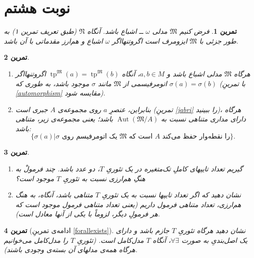\documentclass[12pt,a4paper]{report}
\theoremstyle{colorhead}
\newtheorem{tam}{تمرین}
\DeclareMathOperator{\tp}{tp}
\DeclareMathOperator{\Aut}{Aut}
\begin{document}
\section{نوبت هشتم}
\begin{tam}
فرض کنیم
$\mathfrak{M}$
مدلی
$\omega$ ــ
اشباع باشد. آنگاه
$\mathfrak{N}$
(طبق تعریف تمرین ۱) به طور جزئی با
$\mathfrak{M}$
ایزومرف است اگروتنهااگر
$\omega$
اشباع و هم‌ارز مقدماتی با آن باشد.
\end{tam}
\begin{tam}
\hfill
\begin{enumerate}
\item 
هرگاه
$\mathfrak{M}$
مدلی اشباع باشد و 
$a,b\in M$،
آنگاه
$\tp^\mathfrak{M}(a)=\tp^\mathfrak{M}(b)$
اگروتنهااگر
اتومرفیسمی از
$\mathfrak{M}$
مانند
$\sigma$
موجود باشد، به طوری که
$\sigma(a)=\sigma(b)$
(با تمرینِ
\ref{automorphism}
مقایسه شود).
\item 
بنابراین، عنصرِ
$a$
روی
مجموعه‌ی
$A$
جبری است (تمرینِ
\ref{jabri}
را ببینید)، هرگاه دارای مداری متناهی نسبت به
$\Aut(\mathfrak{M}/A)$
باشد؛ یعنی مجموعه‌ی زیر، متناهی باشد:
\[
\{\sigma(a)| \text{$\sigma$   یک اتومرفیسم روی $\mathfrak{M}$ است که $A$ را نقطه‌وار حفظ می‌کند}\}.
\]
\end{enumerate}
\end{tam}
\begin{tam}
\label{te'dadetype}
\hfill
\begin{enumerate}
\item 
گیریم تعداد تایپهای کاملِ تک‌متغیره در یک تئوریِ
$T$،
دو عدد باشد. چند فرمولْ به هنگِ هم‌ارزی نسبت به تئوریِ
$T$
موجود است؟
\item 
نشان دهید که اگر تعداد تایپها نسبت به یک تئوریِ
$T$
متناهی باشد، آنگاه، به هنگ‌ هم‌ارزی، تعداد متناهی فرمول داریم (یعنی تعداد متناهی فرمول موجود است که هر فرمولِ دیگر، لزوماً با یکی از آنها معادل است).
\end{enumerate}
\end{tam}
\begin{tam}[ادامه‌ی تمرینِ 
\ref{forallexists}]
نشان دهید هرگاه تئوریِ
$T$
جازم باشد و 
دارای یک اصل‌بندیِ به صورت
$\forall \exists$،
  آنگاه 
$T$
مدل‌کامل است.
(تئوریِ
$T$
را مدل‌کامل می‌خوانیم هرگاه همه‌ی مدلهای آن بسته‌ی وجودی باشند). 
\end{tam}
\end{document}
